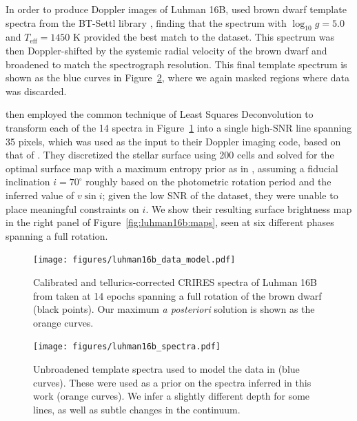 \documentclass[modern]{aastex631}
\begin{document}
In order to produce Doppler images of Luhman 16B, \citet{Crossfield2014} used brown dwarf template spectra from the BT-Settl library \citep{Allard2013}, finding that the spectrum with $\log_{10} g = 5.0$ and $T_\mathrm{eff} = 1450$ K provided the best match to the dataset.
This spectrum was then Doppler-shifted by the systemic radial velocity of the brown dwarf and broadened to match the spectrograph resolution.
This final template spectrum is shown as the blue curves in Figure~\ref{fig:luhman16b:template_spectra}, where we again masked regions where data was discarded.

\citet{Crossfield2014} then employed the common technique of Least Squares Deconvolution \citep[LSD;][]{Donati1997} to transform each of the 14 spectra in Figure~\ref{fig:luhman16b:data_model} into a single high-SNR line spanning 35 pixels, which was used as the input to their Doppler imaging code, based on that of \citet{Vogt1987}.
They discretized the stellar surface using 200 cells and solved for the optimal surface map with a maximum entropy prior as in \citet{Vogt1987}, assuming a fiducial inclination $i=70^\circ$ roughly based on the photometric rotation period and the inferred value of $v\sin i$; given the low SNR of the dataset, they were unable to place meaningful constraints on $i$.
We show their resulting surface brightness map in the right panel of Figure~\ref{fig:luhman16b:maps}, seen at six different phases spanning a full rotation.

\begin{figure}[p!]
    \begin{centering}
        \texttt{[image: figures/luhman16b\_data\_model.pdf]} %
        \caption{%
            Calibrated and tellurics-corrected CRIRES spectra of Luhman 16B from \citet{Crossfield2014} taken at 14 epochs spanning a full rotation of the brown dwarf (black points).
            Our maximum \emph{a posteriori} solution is shown as the orange curves.
        }
        \label{fig:luhman16b:data_model}
    \end{centering}
\end{figure}
%
\begin{figure}[p!]
    \begin{centering}
        \texttt{[image: figures/luhman16b\_spectra.pdf]} %
        \caption{%
            Unbroadened template spectra used to model the data in \citet{Crossfield2014} (blue curves). 
            These were used as a prior on the spectra inferred in this work (orange curves). 
            We infer a slightly different depth for some lines, as well as subtle changes in the continuum.
        }
        \label{fig:luhman16b:template_spectra}
    \end{centering}
\end{figure}
\end{document}
